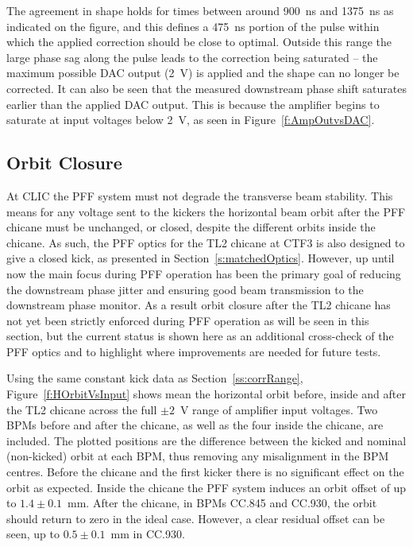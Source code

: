 The agreement in shape holds for times between around 900~ns and 1375~ns as indicated on the figure, and this defines a 475~ns portion of the pulse within which the applied correction should be close to optimal. Outside this range the large phase sag along the pulse leads 
to the correction being saturated -- the maximum possible DAC output 
(2~V) is applied and the shape can no longer be corrected. It can also
be seen that the measured downstream phase shift saturates earlier than
the applied DAC output. This is because the amplifier begins to 
saturate at input voltages below 2~V, as seen in Figure~\ref{f:AmpOutvsDAC}.

\subsection{Orbit Closure}
\label{ss:orbitClosure}

At CLIC the PFF system must not degrade the transverse beam stability. This means for any voltage sent to the kickers the horizontal beam orbit after the PFF chicane must be unchanged, or closed, despite the different orbits inside the chicane. As such, the PFF optics for the TL2 chicane at CTF3 is also designed to give a closed kick, as presented in Section~\ref{s:matchedOptics}. However, up until now the main focus during PFF operation has been the primary goal of reducing the downstream phase jitter and ensuring good beam transmission to the downstream phase monitor. As a result orbit closure after the TL2 chicane has not yet been strictly enforced during PFF operation as will be seen in this section, but the current status is shown here as an additional cross-check of the PFF optics and to highlight where improvements are needed for future tests.

Using the same constant kick data as Section~\ref{ss:corrRange}, Figure~\ref{f:HOrbitVsInput} shows mean the horizontal orbit before, inside and after the TL2 chicane across the full \(\pm2\)~V range of amplifier input voltages. Two BPMs before and after the chicane, as well as the four inside the chicane, are included. The plotted positions are the difference between the kicked and nominal (non-kicked) orbit at each BPM, thus removing any misalignment in the BPM centres. Before the chicane and the first kicker there is no significant effect on the orbit as expected. Inside the chicane the PFF system induces an orbit offset of up to \(1.4\pm0.1\)~mm. After the chicane, in BPMs CC.845 and CC.930, the orbit should return to zero in the ideal case. However, a clear residual offset can be seen, up to \(0.5\pm0.1\)~mm in CC.930.

